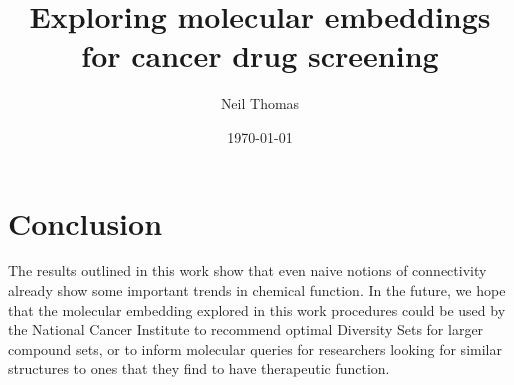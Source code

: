 \documentclass{article}
\title{Exploring molecular embeddings for cancer drug screening}
\date{\today}
\author{Neil Thomas}
\begin{document}
\maketitle






\section{Conclusion}

The results outlined in this work show that even naive notions of connectivity already show some important trends in chemical function. In the future, we hope that the molecular embedding explored in this work procedures could be used by the National Cancer Institute to recommend optimal Diversity Sets for larger compound sets, or to inform molecular queries for researchers looking for similar structures to ones that they find to have therapeutic function.



\clearpage

\end{document}
